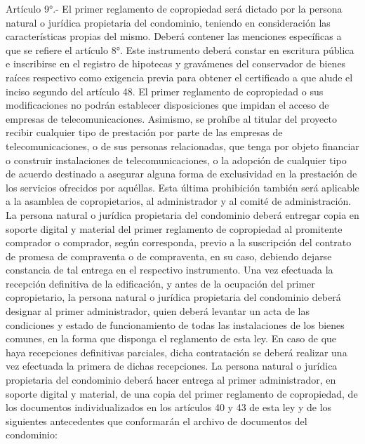      
    Artículo 9°.- El primer reglamento de copropiedad será dictado por la persona natural o jurídica propietaria del condominio, teniendo en consideración las características propias del mismo. Deberá contener las menciones específicas a que se refiere el artículo 8°. Este instrumento deberá constar en escritura pública e inscribirse en el registro de hipotecas y gravámenes del conservador de bienes raíces respectivo como exigencia previa para obtener el certificado a que alude el inciso segundo del artículo 48.
    El primer reglamento de copropiedad o sus modificaciones no podrán establecer disposiciones que impidan el acceso de empresas de telecomunicaciones. Asimismo, se prohíbe al titular del proyecto recibir cualquier tipo de prestación por parte de las empresas de telecomunicaciones, o de sus personas relacionadas, que tenga por objeto financiar o construir instalaciones de telecomunicaciones, o la adopción de cualquier tipo de acuerdo destinado a asegurar alguna forma de exclusividad en la prestación de los servicios ofrecidos por aquéllas. Esta última prohibición también será aplicable a la asamblea de copropietarios, al administrador y al comité de administración.
    La persona natural o jurídica propietaria del condominio deberá entregar copia en soporte digital y material del primer reglamento de copropiedad al promitente comprador o comprador, según corresponda, previo a la suscripción del contrato de promesa de compraventa o de compraventa, en su caso, debiendo dejarse constancia de tal entrega en el respectivo instrumento.
    Una vez efectuada la recepción definitiva de la edificación, y antes de la ocupación del primer copropietario, la persona natural o jurídica propietaria del condominio deberá designar al primer administrador, quien deberá levantar un acta de las condiciones y estado de funcionamiento de todas las instalaciones de los bienes comunes, en la forma que disponga el reglamento de esta ley. En caso de que haya recepciones definitivas parciales, dicha contratación se deberá realizar una vez efectuada la primera de dichas recepciones.
    La persona natural o jurídica propietaria del condominio deberá hacer entrega al primer administrador, en soporte digital y material, de una copia del primer reglamento de copropiedad, de los documentos individualizados en los artículos 40 y 43 de esta ley y de los siguientes antecedentes que conformarán el archivo de documentos del condominio:
     
